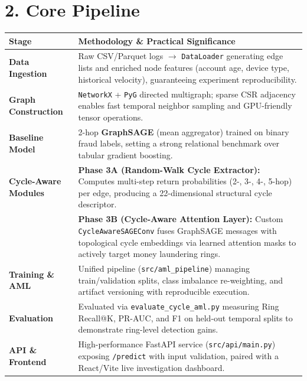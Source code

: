 \documentclass[10pt]{article}
\begin{document}
\section*{2. Core Pipeline}
\begin{tabularx}{\textwidth}{@{}p{} X@{}}
\toprule
\textbf{Stage} & \textbf{Methodology \& Practical Significance} \\
\midrule
\textbf{Data Ingestion} & Raw CSV/Parquet logs $\rightarrow$ \texttt{DataLoader} generating edge lists and enriched node features (account age, device type, historical velocity), guaranteeing experiment reproducibility. \\
\addlinespace
\textbf{Graph Construction} & \texttt{NetworkX} + \texttt{PyG} directed multigraph; sparse CSR adjacency enables fast temporal neighbor sampling and GPU-friendly tensor operations. \\
\addlinespace
\textbf{Baseline Model} & 2-hop \textbf{GraphSAGE} (mean aggregator) trained on binary fraud labels, setting a strong relational benchmark over tabular gradient boosting. \\
\addlinespace
\textbf{Cycle-Aware Modules} & \textbf{Phase 3A (Random-Walk Cycle Extractor):} Computes multi-step return probabilities (2-, 3-, 4-, 5-hop) per edge, producing a 22-dimensional structural cycle descriptor.\\
& \textbf{Phase 3B (Cycle-Aware Attention Layer):} Custom \texttt{CycleAwareSAGEConv} fuses GraphSAGE messages with topological cycle embeddings via learned attention masks to actively target money laundering rings. \\
\addlinespace
\textbf{Training \& AML} & Unified pipeline (\texttt{src/aml\_pipeline}) managing train/validation splits, class imbalance re-weighting, and artifact versioning with reproducible execution. \\
\addlinespace
\textbf{Evaluation} & Evaluated via \texttt{evaluate\_cycle\_aml.py} measuring Ring Recall@K, PR-AUC, and F1 on held-out temporal splits to demonstrate ring-level detection gains. \\
\addlinespace
\textbf{API \& Frontend} & High-performance FastAPI service (\texttt{src/api/main.py}) exposing \texttt{/predict} with input validation, paired with a React/Vite live investigation dashboard. \\
\bottomrule
\end{tabularx}
\end{document}
